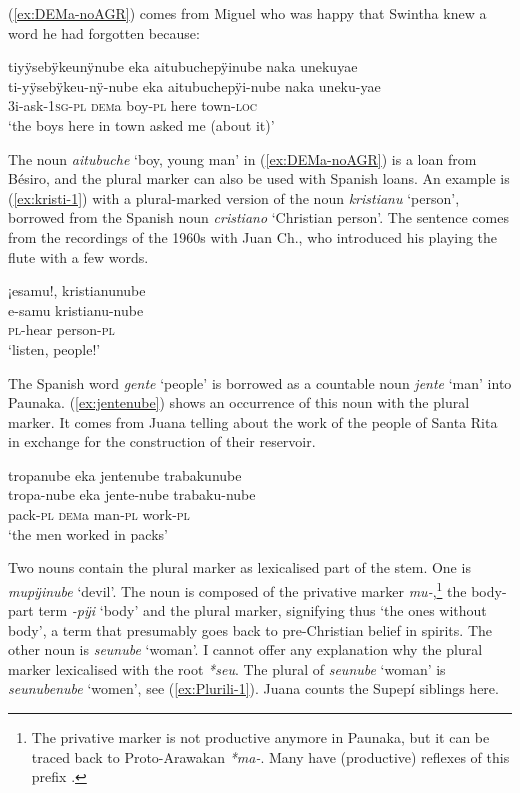 (\ref{ex:DEMa-noAGR}) comes from Miguel who was happy that Swintha knew a word he had forgotten because:

\ea\label{ex:DEMa-noAGR}
\begingl 
\glpreamble tiyÿsebÿkeunÿnube eka aitubuchepÿinube naka unekuyae\\
\gla ti-yÿsebÿkeu-nÿ-nube eka aitubuchepÿi-nube naka uneku-yae\\ 
\glb 3i-ask-1\textsc{sg}-\textsc{pl} \textsc{dem}a boy-\textsc{pl} here town-\textsc{loc}\\ 
\glft ‘the boys here in town asked me (about it)’
\trailingcitation{[mdx-c120416ls.121]}
\xe

The noun \textit{aitubuche} ‘boy, young man’ in (\ref{ex:DEMa-noAGR}) is a loan from Bésiro, and the plural marker can also be used with Spanish loans. An example is (\ref{ex:kristi-1}) with a plural-marked version of the noun \textit{kristianu} ‘person’, borrowed from the Spanish noun \textit{cristiano} ‘Christian person’. The sentence comes from the recordings of the 1960s with Juan Ch., who introduced his playing the flute with a few words.

\ea\label{ex:kristi-1}
\begingl 
\glpreamble ¡esamu!, kristianunube\\
\gla e-samu kristianu-nube\\ 
\textsc{pl}-hear person-\textsc{pl}\\ 
\glft ‘listen, people!’
\trailingcitation{[nxx-a630101g-2.002]}
\xe

The Spanish word \textit{gente} ‘people’ is borrowed as a countable noun \textit{jente} ‘man’ into Paunaka. (\ref{ex:jentenube}) shows an occurrence of this noun with the plural marker. It comes from Juana telling about the work of the people of Santa Rita in exchange for the construction of their reservoir.

\ea\label{ex:jentenube}
\begingl 
\glpreamble tropanube eka jentenube trabakunube\\
\gla tropa-nube eka jente-nube trabaku-nube\\ 
\glb pack-\textsc{pl} \textsc{dem}a man-\textsc{pl} work-\textsc{pl}\\ 
\glft ‘the men worked in packs’
\trailingcitation{[jxx-p120515l-2.112]}
\xe

Two nouns contain the plural marker as lexicalised part of the stem. One is \textit{mu\-pÿi\-nube} ‘devil’. The noun is composed of the privative marker \textit{mu-},\footnote{The privative marker is not productive anymore in Paunaka, but it can be traced back to Proto-Arawakan \textit{*ma-}. Many  have (productive) reflexes of this prefix \citep[276]{Michael2014b}.} the body-part term \textit{-pÿi} ‘body’ and the plural marker, signifying thus ‘the ones without body’, a term that presumably goes back to pre-Christian belief in spirits. The other noun is \textit{seunube} ‘woman’. I cannot offer any explanation why the plural marker lexicalised with the root \textit{*seu}. The plural of \textit{seunube} ‘woman’ is \textit{seunubenube} ‘women’, see (\ref{ex:Plurili-1}). Juana counts the Supepí siblings here.

